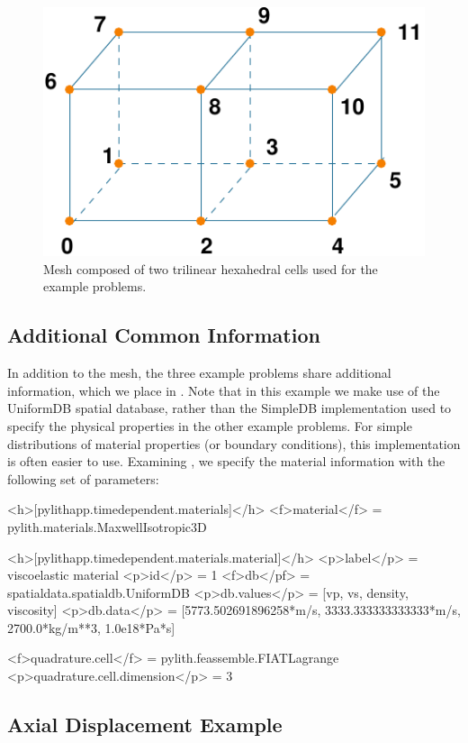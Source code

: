 \begin{figure}
  \includegraphics{examples/figs/twohex8-mesh}
  \caption{Mesh composed of two trilinear hexahedral cells used for
    the example problems.}
  \label{fig:twohex8-mesh}
\end{figure}


\subsection{Additional Common Information}

In addition to the mesh, the three example problems share additional
information, which we place in . Note that in
this example we make use of the UniformDB spatial database, rather
than the SimpleDB implementation used to specify the physical properties
in the other example problems. For simple distributions of material
properties (or boundary conditions), this implementation is often
easier to use. Examining , we specify the material
information with the following set of parameters:
\begin{cfg}
<h>[pylithapp.timedependent.materials]</h>
<f>material</f> = pylith.materials.MaxwellIsotropic3D

<h>[pylithapp.timedependent.materials.material]</h>
<p>label</p> = viscoelastic material
<p>id</p> = 1
<f>db</pf> = spatialdata.spatialdb.UniformDB
<p>db.values</p> = [vp, vs, density, viscosity]
<p>db.data</p> = [5773.502691896258*m/s, 3333.333333333333*m/s, 2700.0*kg/m**3, 1.0e18*Pa*s]

<f>quadrature.cell</f> = pylith.feassemble.FIATLagrange
<p>quadrature.cell.dimension</p> = 3
\end{cfg}

\subsection{Axial Displacement Example}

